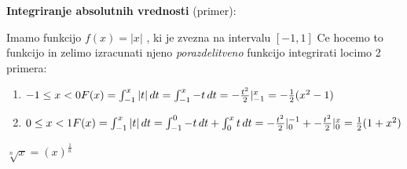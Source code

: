     \textbf{Integriranje absolutnih vrednosti} (primer):
    \begin{small}
        Imamo funkcijo $f(x) = |x|$ , ki je zvezna na intervalu $[-1, 1]$
        Ce hocemo to funkcijo in zelimo izracunati njeno 
        \textit{porazdelitveno} funkcijo integrirati locimo 2 primera:    
    \end{small}
    \begin{enumerate}
        \item \begin{math}
            -1 \leq x < 0\\
            F(x) = \int_{-1}^x |t|\,dt = \int_{-1}^x -t\,dt = - \frac{t^2}{2} \rvert_{-1}^{x} = - \frac{1}{2} (x^2 -1)
        \end{math}
        \item \begin{math}
            0 \leq x < 1 \\
            F(x) = \int_{-1}^x |t|\,dt = \int_{-1}^0 -t\,dt + \int_{0}^x t\,dt = - \frac{t^2}{2} \rvert_{0}^{-1} + - \frac{t^2}{2} \rvert_{0}^{x}= \frac{1}{2} (1 + x^2)
        \end{math}
    \end{enumerate}
\begin{small}
    \begin{math}
        \sqrt[n] x = (x)^{\frac{1}{n}}
    \end{math}    
\end{small}
